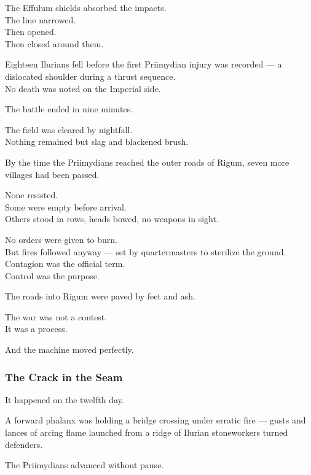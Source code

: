 \documentclass[12pt]{article}
\begin{document}
The Effulum shields absorbed the impacts.\\
The line narrowed.\\
Then opened.\\
Then closed around them.

Eighteen Ilurians fell before the first Priimydian injury was recorded — a dislocated shoulder during a thrust sequence.\\
No death was noted on the Imperial side.

\vspace{1em}

The battle ended in nine minutes.

The field was cleared by nightfall.\\
Nothing remained but slag and blackened brush.

\vspace{1em}

By the time the Priimydians reached the outer roads of Rigum, seven more villages had been passed.

None resisted.\\
Some were empty before arrival.\\
Others stood in rows, heads bowed, no weapons in sight.

No orders were given to burn.\\
But fires followed anyway — set by quartermasters to sterilize the ground.\\
Contagion was the official term.\\
Control was the purpose.

\vspace{1em}

The roads into Rigum were paved by feet and ash.

The war was not a contest.\\
It was a process.

And the machine moved perfectly.

\dotfill

\subsubsection{The Crack in the Seam}

It happened on the twelfth day.

A forward phalanx was holding a bridge crossing under erratic fire — gusts and lances of arcing flame launched from a ridge of Ilurian stoneworkers turned defenders.

The Priimydians advanced without pause.
\end{document}
